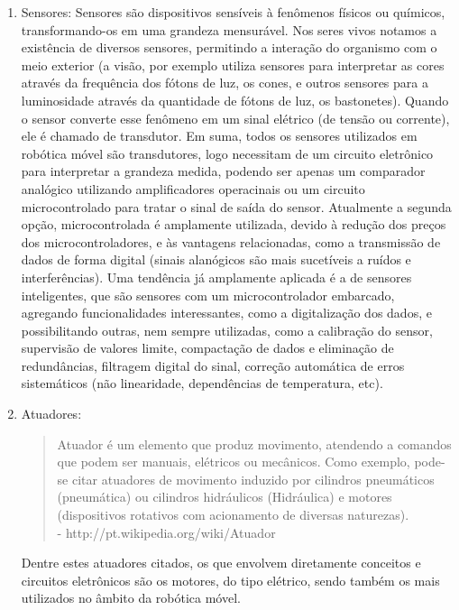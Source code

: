 \begin{enumerate}
\item Sensores:
	Sensores s\~ao dispositivos sens\'iveis \`a fen\^omenos f\'isicos ou qu\'imicos, transformando-os em uma grandeza mensur\'avel. Nos seres vivos notamos a existência de diversos sensores, permitindo a interaç\~ao do organismo com o meio exterior (a vis\~ao, por exemplo utiliza sensores para interpretar as cores atrav\'es da frequ\^encia dos f\'otons de luz, os cones, e outros sensores para a luminosidade atrav\'es da quantidade de f\'otons de luz, os bastonetes).
	Quando o sensor converte esse fen\^omeno em um sinal el\'etrico (de tens\~ao ou corrente), ele \'e chamado de transdutor. Em suma, todos os sensores utilizados em rob\'otica m\'ovel s\~ao transdutores, logo necessitam de um circuito eletr\^onico para interpretar a grandeza medida, podendo ser apenas um comparador anal\'ogico utilizando amplificadores operacinais ou um circuito microcontrolado para tratar o sinal de sa\'ida do sensor. Atualmente a segunda opç\~ao, microcontrolada \'e amplamente utilizada, devido \`a reduç\~ao dos preços dos microcontroladores, e \`as vantagens relacionadas, como a transmiss\~ao de dados de forma digital (sinais alan\'ogicos s\~ao mais sucet\'iveis a ru\'idos e interfer\^encias).
	Uma tend\^encia j\'a amplamente aplicada \'e a de sensores inteligentes, que s\~ao sensores com um microcontrolador embarcado, agregando funcionalidades interessantes, como a digitalizaç\~ao dos dados, e possibilitando outras, nem sempre utilizadas, como a calibraç\~ao do sensor, supervis\~ao de valores limite, compactaç\~ao de dados e eliminaç\~ao de redund\^ancias, filtragem digital do sinal, correç\~ao autom\'atica de erros sistem\'aticos (não linearidade, dependências de temperatura, etc).\cite{apostilaStemmer}
	
\item Atuadores:
	\begin{quote}
	Atuador é um elemento que produz movimento, atendendo a comandos que podem ser manuais, elétricos ou mecânicos. Como exemplo, pode-se citar atuadores de movimento induzido por cilindros pneumáticos (pneumática) ou cilindros hidráulicos (Hidráulica) e motores (dispositivos rotativos com acionamento de diversas naturezas).
	\\- http://pt.wikipedia.org/wiki/Atuador
	\end{quote}
	Dentre estes atuadores citados, os que envolvem diretamente conceitos e circuitos eletr\^onicos s\~ao os motores, do tipo el\'etrico, sendo tamb\'em os mais utilizados no \^ambito da rob\'otica m\'ovel.
	

\end{enumerate}
